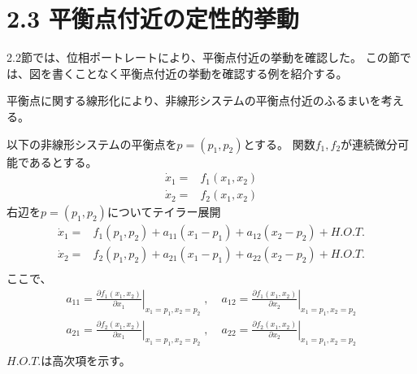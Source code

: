 \documentclass{jsarticle}
\begin{document}
\newpage

\section*{2.3 平衡点付近の定性的挙動}
2.2節では、位相ポートレートにより、平衡点付近の挙動を確認した。
この節では、図を書くことなく平衡点付近の挙動を確認する例を紹介する。

平衡点に関する線形化により、非線形システムの平衡点付近のふるまいを考える。

以下の非線形システムの平衡点を$p=(p_1,p_2)$とする。
関数$f_1,f_2$が連続微分可能であるとする。
\begin{align*}
  \dot x_1 = & f_1(x_1,x_2)\\
  \dot x_2 = & f_2(x_1,x_2)
\end{align*}
右辺を$p=(p_1,p_2)$についてテイラー展開
\begin{align*}
  \dot x_1 =& f_1(p_1,p_2) + a_{11}(x_1-p_1) + a_{12}(x_2-p_2) + H.O.T.\\
  \dot x_2 =& f_2(p_1,p_2) + a_{21}(x_1-p_1) + a_{22}(x_2-p_2) + H.O.T.\\
\end{align*}
ここで、
\begin{align*}
  a_{11} = \left.\frac{\partial f_1(x_1,x_2)}{\partial x_1}\right|_{x_1=p_1,x_2=p_2}\;,&\;
  a_{12} = \left.\frac{\partial f_1(x_1,x_2)}{\partial x_2}\right|_{x_1=p_1,x_2=p_2}\\
  a_{21} = \left.\frac{\partial f_2(x_1,x_2)}{\partial x_1}\right|_{x_1=p_1,x_2=p_2}\;,&\;
  a_{22} = \left.\frac{\partial f_2(x_1,x_2)}{\partial x_2}\right|_{x_1=p_1,x_2=p_2}\\
\end{align*}
$H.O.T.$は高次項を示す。
\end{document}
